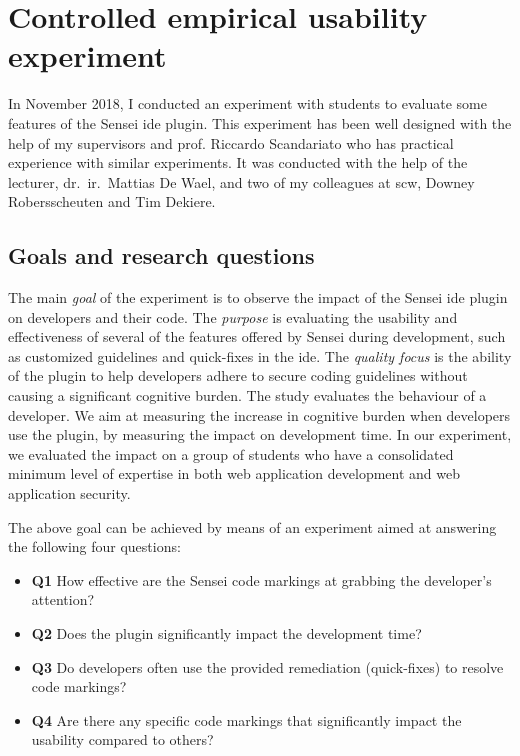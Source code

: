 \section{Controlled empirical usability experiment}
\label{sec:experiment}

In November 2018, I conducted an experiment with students to evaluate some features of the Sensei \gls{ide} plugin.
This experiment has been well designed with the help of my supervisors and prof. Riccardo Scandariato who has practical experience with similar experiments.
It was conducted with the help of the lecturer, dr.\ ir.\ Mattias De Wael, and two of my colleagues at \gls{scw}, Downey Robersscheuten and Tim Dekiere.

\subsection{Goals and research questions}
The main \textit{goal} of the experiment is to observe the impact of the Sensei \gls{ide} plugin on developers and their code.
The \textit{purpose} is evaluating the usability and effectiveness of several of the features offered by Sensei during development, such as customized guidelines and quick-fixes in the \gls{ide}.
The \textit{quality focus} is the ability of the plugin to help developers adhere to secure coding guidelines without causing a significant cognitive burden.
The study evaluates the behaviour of a developer.
We aim at measuring the increase in cognitive burden when developers use the plugin, by measuring the impact on development time.
In our experiment, we evaluated the impact on a group of students who have a consolidated minimum level of expertise in both web application development and web application security.

The above goal can be achieved by means of an experiment aimed at answering the following four questions:
\begin{itemize}
    \item \textbf{Q1} How effective are the Sensei code markings at grabbing the developer's attention?
    \item \textbf{Q2} Does the plugin significantly impact the development time?
    \item \textbf{Q3} Do developers often use the provided remediation (quick-fixes) to resolve code markings?
    \item \textbf{Q4} Are there any specific code markings that significantly impact the usability compared to others?
\end{itemize}

